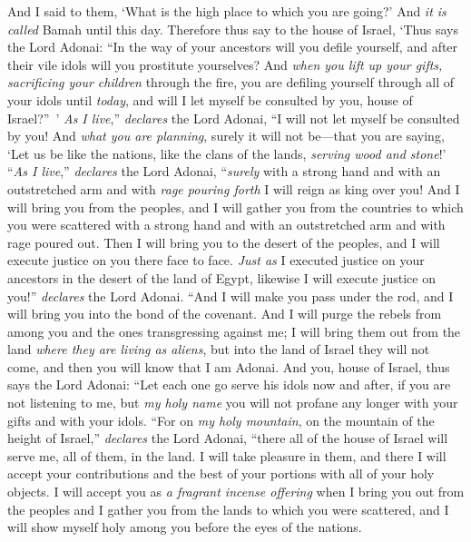 \begin{biblechapter}
\verse And I said to them, ‘What is the high place to which you are going?’ And \textit{it is called} Bamah until this day.
\verse Therefore thus say to the house of Israel, ‘Thus says the Lord Adonai: “In the way of your ancestors will you defile yourself, and after their vile idols will you prostitute yourselves?
\verse And \textit{when you lift up your gifts, sacrificing your children} through the fire, you are defiling yourself through all of your idols until \textit{today}, and will I let myself be consulted by you, house of Israel?” ’ \textit{As I live},” \textit{declares} the Lord Adonai, “I will not let myself be consulted by you!
\verse And \textit{what you are planning}, surely it will not be—that you are saying, ‘Let us be like the nations, like the clans of the lands, \textit{serving wood and stone}!’
\verse “\textit{As I live},” \textit{declares} the Lord Adonai, “\textit{surely} with a strong hand and with an outstretched arm and with \textit{rage pouring forth} I will reign as king over you!
\verse And I will bring you from the peoples, and I will gather you from the countries to which you were scattered with a strong hand and with an outstretched arm and with rage poured out.
\verse Then I will bring you to the desert of the peoples, and I will execute justice on you there face to face.
\verse \textit{Just as} I executed justice on your ancestors in the desert of the land of Egypt, likewise I will execute justice on you!” \textit{declares} the Lord Adonai.
\verse “And I will make you pass under the rod, and I will bring you into the bond of the covenant.
\verse And I will purge the rebels from among you and the ones transgressing against me; I will bring them out from the land \textit{where they are living as aliens}, but into the land of Israel they will not come, and then you will know that I am Adonai.
\verse And you, house of Israel, thus says the Lord Adonai: “Let each one go serve his idols now and after, if you are not listening to me, but \textit{my holy name} you will not profane any longer with your gifts and with your idols.
\verse “For on \textit{my holy mountain}, on the mountain of the height of Israel,” \textit{declares} the Lord Adonai, “there all of the house of Israel will serve me, all of them, in the land. I will take pleasure in them, and there I will accept your contributions and the best of your portions with all of your holy objects.
\verse I will accept you as \textit{a fragrant incense offering} when I bring you out from the peoples and I gather you from the lands to which you were scattered, and I will show myself holy among you before the eyes of the nations.

\end{biblechapter}
